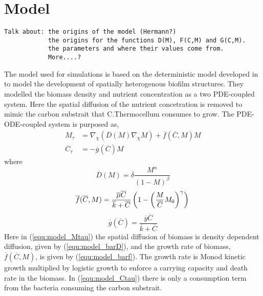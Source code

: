 \section{Model}

\begin{verbatim}
Talk about: the origins of the model (Hermann?) 
            the origins for the functions D(M), F(C,M) and G(C,M). 
            the parameters and where their values come from. 
            More....?
\end{verbatim}

The model used for simulations is based on the deterministic model developed in \cite{eberl2001deterministic} to model the development of spatially heterogenous biofilm structures. They modelled the biomass density and nutrient concentration as a two PDE-coupled system. Here the spatial diffusion of the nutrient concetration is removed to mimic the carbon substrait that C.Thermocellum consumes to grow. The PDE-ODE-coupled system is purposed as,
  \begin{align} 
     M_\tau &= \nabla_\chi \left(  \overline{D}(M) \nabla_\chi M \right) + \overline{f}(\overline{C},M) M \label{equ:model_Mtau}\\
     \overline{C}_\tau &= -\overline{g}(\overline{C}) M \label{equ:model_Ctau}
  \end{align}
where
  \begin{equation} \label{equ:model_barD}
    \overline{D}(M) = \overline{\delta} \frac{M^\alpha}{(1-M)^\beta}
  \end{equation}
  \begin{equation} \label{equ:model_barf}
    \overline{f}(\overline{C},M) = \frac{\overline{\mu} \overline{C}}{\overline{k} + \overline{C}} \left(1 - \left( \frac{M}{\overline{C}} M_0 \right)^\gamma \right) \\
  \end{equation}
  \begin{equation} \label{equ:model_barg}
    \overline{g}(\overline{C}) = \frac{\overline{y} \overline{C}}{\overline{k} + \overline{C}}
  \end{equation}
Here in (\ref{equ:model_Mtau}) the spatial diffusion of biomass is density dependent diffusion, given by (\ref{equ:model_barD}), and the growth rate of biomass, $\overline{f}(\overline{C},M)$, is given by (\ref{equ:model_barf}). The growth rate is Monod kinetic growth multiplied by logistic growth to enforce a carrying capacity and death rate in the biomass. In (\ref{equ:model_Ctau}) there is only a consumption term from the bacteria consuming the carbon substrait. 
  
